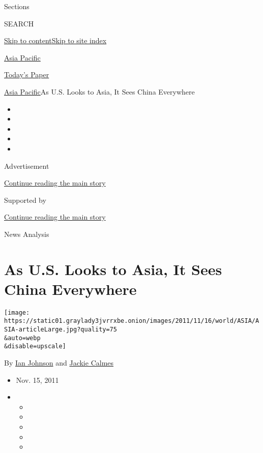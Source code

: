 Sections

SEARCH

\protect\hyperlink{site-content}{Skip to
content}\protect\hyperlink{site-index}{Skip to site index}

\href{https://www.nytimes3xbfgragh.onion/section/world/asia}{Asia
Pacific}

\href{https://myaccount.nytimes3xbfgragh.onion/auth/login?response_type=cookie\&client_id=vi}{}

\href{https://www.nytimes3xbfgragh.onion/section/todayspaper}{Today's
Paper}

\href{/section/world/asia}{Asia Pacific}\textbar{}As U.S. Looks to Asia,
It Sees China Everywhere

\begin{itemize}
\item
\item
\item
\item
\item
\end{itemize}

Advertisement

\protect\hyperlink{after-top}{Continue reading the main story}

Supported by

\protect\hyperlink{after-sponsor}{Continue reading the main story}

News Analysis

\hypertarget{as-us-looks-to-asia-it-sees-china-everywhere}{%
\section{As U.S. Looks to Asia, It Sees China
Everywhere}\label{as-us-looks-to-asia-it-sees-china-everywhere}}

\texttt{[image: https://static01.graylady3jvrrxbe.onion/images/2011/11/16/world/ASIA/ASIA-articleLarge.jpg?quality=75\\\&auto=webp\\\&disable=upscale]}

By \href{https://www.nytimes3xbfgragh.onion/by/ian-johnson}{Ian Johnson}
and \href{https://www.nytimes3xbfgragh.onion/by/jackie-calmes}{Jackie
Calmes}

\begin{itemize}
\item
  Nov. 15, 2011
\item
  \begin{itemize}
  \item
  \item
  \item
  \item
  \item
  \end{itemize}
\end{itemize}

